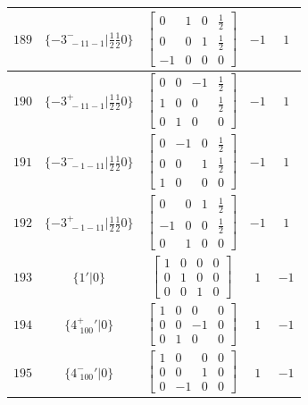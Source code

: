 \documentclass[fleqn,8pt]{jsarticle}
\begin{document}
\begin{longtable}{ccccc}
$ 189 $ & $ \{-3^{-}_{\,\,-11-1}|\frac{1}{2} \frac{1}{2} 0\} $ & $ \begin{bmatrix} 0 & 1 & 0 & \frac{1}{2} \\ 0 & 0 & 1 & \frac{1}{2} \\ -1 & 0 & 0 & 0 \end{bmatrix} $ & $ -1 $ & $ 1 $ \\ \hline
$ 190 $ & $ \{-3^{+}_{\,\,-11-1}|\frac{1}{2} \frac{1}{2} 0\} $ & $ \begin{bmatrix} 0 & 0 & -1 & \frac{1}{2} \\ 1 & 0 & 0 & \frac{1}{2} \\ 0 & 1 & 0 & 0 \end{bmatrix} $ & $ -1 $ & $ 1 $ \\ \hline
$ 191 $ & $ \{-3^{-}_{\,\,-1-11}|\frac{1}{2} \frac{1}{2} 0\} $ & $ \begin{bmatrix} 0 & -1 & 0 & \frac{1}{2} \\ 0 & 0 & 1 & \frac{1}{2} \\ 1 & 0 & 0 & 0 \end{bmatrix} $ & $ -1 $ & $ 1 $ \\ \hline
$ 192 $ & $ \{-3^{+}_{\,\,-1-11}|\frac{1}{2} \frac{1}{2} 0\} $ & $ \begin{bmatrix} 0 & 0 & 1 & \frac{1}{2} \\ -1 & 0 & 0 & \frac{1}{2} \\ 0 & 1 & 0 & 0 \end{bmatrix} $ & $ -1 $ & $ 1 $ \\ \hline
$ 193 $ & $ \{1{}'|0\} $ & $ \begin{bmatrix} 1 & 0 & 0 & 0 \\ 0 & 1 & 0 & 0 \\ 0 & 0 & 1 & 0 \end{bmatrix} $ & $ 1 $ & $ -1 $ \\ \hline
$ 194 $ & $ \{4^{+}_{\,\,100}{}'|0\} $ & $ \begin{bmatrix} 1 & 0 & 0 & 0 \\ 0 & 0 & -1 & 0 \\ 0 & 1 & 0 & 0 \end{bmatrix} $ & $ 1 $ & $ -1 $ \\ \hline
$ 195 $ & $ \{4^{-}_{\,\,100}{}'|0\} $ & $ \begin{bmatrix} 1 & 0 & 0 & 0 \\ 0 & 0 & 1 & 0 \\ 0 & -1 & 0 & 0 \end{bmatrix} $ & $ 1 $ & $ -1 $ \\ \hline

\end{longtable}
\end{document}
